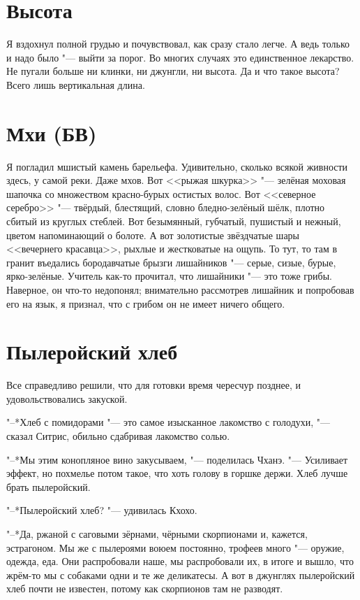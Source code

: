 \documentclass[a4paper,10pt]{book}
\begin{document}
 \section{Высота}

 Я вздохнул полной грудью и почувствовал, как сразу стало легче. А ведь только 
и 
надо было "--- выйти за порог. Во многих случаях это единственное лекарство. Не 
пугали больше ни клинки, ни джунгли, ни 
высота. Да и что такое высота? Всего лишь вертикальная длина.
 
 \section{Мхи (БВ)}

 Я погладил мшистый камень барельефа. Удивительно, сколько всякой живности 
здесь, у самой реки. Даже мхов. Вот <<рыжая шкурка>> "--- зелёная моховая 
шапочка со множеством красно-бурых остистых волос. Вот <<северное серебро>> 
"--- 
твёрдый, блестящий, словно бледно-зелёный шёлк, плотно сбитый из 
круглых стеблей. Вот безымянный, губчатый, пушистый и нежный, цветом 
напоминающий о болоте. А вот золотистые звёздчатые шары <<вечернего красавца>>, 
рыхлые и жестковатые на ощупь. То тут, то там в гранит въедались бородавчатые 
брызги лишайников "--- серые, сизые, бурые, ярко-зелёные. Учитель как-то 
прочитал, что лишайники "--- это тоже грибы. Наверное, он что-то недопонял; 
внимательно рассмотрев лишайник и попробовав его на язык, я признал, что с 
грибом он не имеет ничего общего.
 
\section{Пылеройский хлеб}
 
Все справедливо решили, что для готовки время чересчур позднее, и 
удовольствовались закуской.

"--*Хлеб с помидорами "--- это самое изысканное лакомство с голодухи, "--- 
сказал Ситрис, обильно сдабривая лакомство солью.

"--*Мы этим конопляное вино закусываем, "--- поделилась Чханэ. "--- Усиливает 
эффект,
но похмелье потом такое, что хоть голову в горшке держи. Хлеб 
лучше брать пылеройский.

"--*Пылеройский хлеб? "--- удивилась Кхохо.

"--*Да, ржаной с саговыми зёрнами, чёрными скорпионами и, кажется, эстрагоном. 
Мы же с пылероями воюем постоянно, трофеев много "--- оружие, одежда, еда. Они 
распробовали наше, мы распробовали их, в итоге и вышло, что жрём-то мы с 
собаками одни и те же деликатесы. А вот в джунглях пылеройский хлеб почти не 
известен, потому как скорпионов там не разводят.
 
\end{document}
